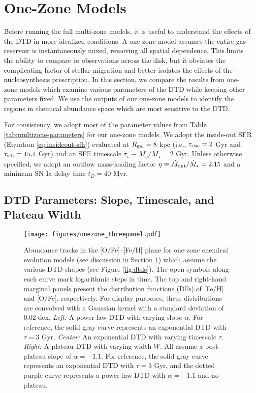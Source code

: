 \documentclass[twocolumn,twocolappendix]{aastex631}
\begin{document}
\section{One-Zone Models}
\label{sec:onezone-results}

Before running the full multi-zone models, it is useful to understand the effects of the DTD in more idealized conditions. A one-zone model assumes the entire gas reservoir is instantaneously mixed, removing all spatial dependence. This limits the ability to compare to observations across the disk, but it obviates the complicating factor of stellar migration and better isolates the effects of the nucleosynthesis prescription. In this section, we compare the results from one-zone models which examine various parameters of the DTD while keeping other parameters fixed. We use the outputs of our one-zone models to identify the regions in chemical abundance space which are most sensitive to the DTD.

For consistency, we adopt most of the parameter values from Table \ref{tab:multizone-parameters} for our one-zone models.
We adopt the inside-out SFR (Equation \ref{eq:insideout-sfh}) evaluated at $R_{\rm gal}=8$ kpc (i.e., $\tau_{\rm rise}=2$ Gyr and $\tau_{\rm sfh}=15.1$ Gyr) and an SFE timescale $\tau_\star\equiv M_g/\dot M_\star=2$ Gyr. Unless otherwise specified, we adopt an outflow mass-loading factor $\eta\equiv \dot M_{\rm out}/\dot M_\star=2.15$  and a minimum SN Ia delay time $t_D=40$ Myr. 

\subsection{DTD Parameters: Slope, Timescale, and Plateau Width}
\label{sec:onezone-dtd-params}

\begin{figure*}
    \centering
    \texttt{[image: figures/onezone\_threepanel.pdf]}
    \caption{Abundance tracks in the [O/Fe]--[Fe/H] plane for one-zone chemical evolution models (see discussion in Section \ref{sec:onezone-results}) which assume the various DTD shapes (see Figure \ref{fig:dtds}). The open symbols along each curve mark logarithmic steps in time. The top and right-hand marginal panels present the distribution functions (DFs) of [Fe/H] and [O/Fe], respectively. For display purposes, these distributions are convolved with a Gaussian kernel with a standard deviation of 0.02 dex. 
    \textit{Left:} A power-law DTD with varying slope $\alpha$. For reference, the solid gray curve represents an exponential DTD with $\tau=3$ Gyr. 
    \textit{Center:} An exponential DTD with varying timescale $\tau$. 
    \textit{Right:} A plateau DTD with varying width $W$. All assume a post-plateau slope of $\alpha=-1.1$. For reference, the solid gray curve represents an exponential DTD with $\tau=3$ Gyr, and the dotted purple curve represents a power-law DTD with $\alpha=-1.1$ and no plateau.}
    \label{fig:onezone-threepanel}
\end{figure*}
\end{document}
